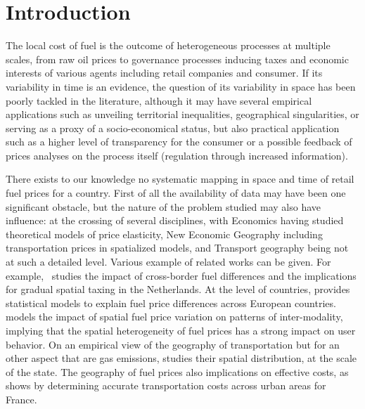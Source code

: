 \documentclass[3p,times,procedia]{elsarticle}
\begin{document}




\section{Introduction}
\label{main}

The local cost of fuel is the outcome of heterogeneous processes at multiple scales, from raw oil prices to governance processes inducing taxes and economic interests of various agents including retail companies and consumer. If its variability in time is an evidence, the question of its variability in space has been poorly tackled in the literature, although it may have several empirical applications such as unveiling territorial inequalities, geographical singularities, or serving as a proxy of a socio-economical status, but also practical application such as a higher level of transparency for the consumer or a possible feedback of prices analyses on the process itself (regulation through increased information).


There exists to our knowledge no systematic mapping in space and time of retail fuel prices for a country. First of all the availability of data may have been one significant obstacle, but the nature of the problem studied may also have influence: at the crossing of several disciplines, with Economics having studied theoretical models of price elasticity, New Economic Geography including transportation prices in spatialized models, and Transport geography being not at such a detailed level. Various example of related works can be given. For example,~\cite{rietveld2001spatial} studies the impact of cross-border fuel differences and the implications for gradual spatial taxing in the Netherlands. At the level of countries, \cite{rietveld2005fuel} provides statistical models to explain fuel price differences across European countries. \cite{macharis2010decision} models the impact of spatial fuel price variation on patterns of inter-modality, implying that the spatial heterogeneity of fuel prices has a strong impact on user behavior. On an empirical view of the geography of transportation but for an other aspect that are gas emissions, \cite{gregg2009temporal} studies their spatial distribution, at the scale of the state. The geography of fuel prices also implications on effective costs, as shows \cite{combes2005transport} by determining accurate transportation costs across urban areas for France.
\end{document}
